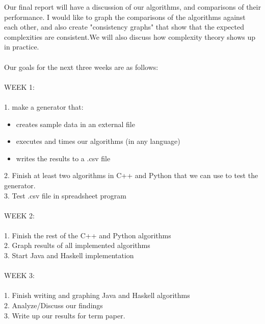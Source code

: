 \documentclass[12pt]{amsart}
\begin{document}
Our final report will have a discussion of our algorithms, and comparisons of their performance. I would like to 
graph the comparisons of the algorithms against each other, and also create "consistency graphs" that show that
the expected complexities are consistent.We will also discuss how complexity theory shows up in practice.\\ \\
Our goals for the next three weeks are as follows:\\ \\
WEEK 1:\\ \\
1. make a generator that:
\begin{itemize}
\item creates sample data in an external file
\item executes and times our algorithms (in any language)
\item writes the results to a .csv file\\
\end{itemize}
2. Finish at least two algorithms in C++ and Python that we can use to test the generator. \\
3. Test .csv file in spreadsheet program\\ \\
WEEK 2:\\ \\
1. Finish the rest of the C++ and Python algorithms\\ 
2. Graph results of all implemented algorithms\\
3. Start Java and Haskell implementation\\ \\
WEEK 3:\\ \\
1. Finish writing and graphing Java and Haskell algorithms\\
2. Analyze/Discuss our findings\\
3. Write up our results for term paper.\\
\end{document}
